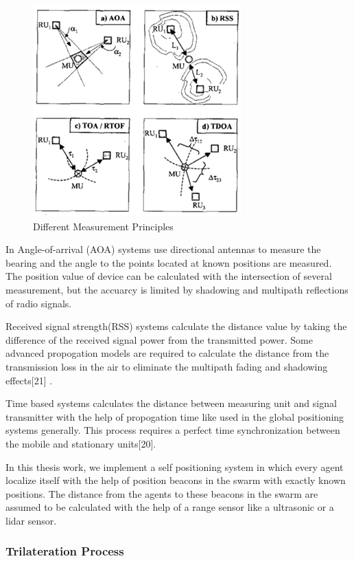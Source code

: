 \documentclass[twoside]{article}
\begin{document}
\begin{figure}[H]
	\caption{Different Measurement Principles}
	\centering
	\includegraphics[scale = 1]{measurement}
\end{figure} 

In Angle-of-arrival (AOA) systems use directional antennas to measure the bearing and the angle to the points located at known positions are measured. The position value of device can be calculated with the intersection of several measurement, but the accuarcy is limited by shadowing and multipath reflections of radio signals. 

Received signal strength(RSS) systems calculate the distance value by taking the difference of the received signal power from the transmitted power. Some advanced propogation models are required to calculate the distance from the transmission loss in the air to eliminate the multipath fading and shadowing effects[21] . 

Time based systems calculates the distance between measuring unit and signal transmitter with the help of propogation time like used in the global positioning systems generally. This process requires a perfect time synchronization between the mobile and stationary units[20].

In this thesis work, we implement a self positioning system in which every agent localize itself with the help of position beacons in the swarm with exactly known positions. The distance from the agents to these beacons in the swarm are assumed to be calculated with the help of a range sensor like a ultrasonic or a lidar sensor. 


\subsubsection{Trilateration Process}
\end{document}

